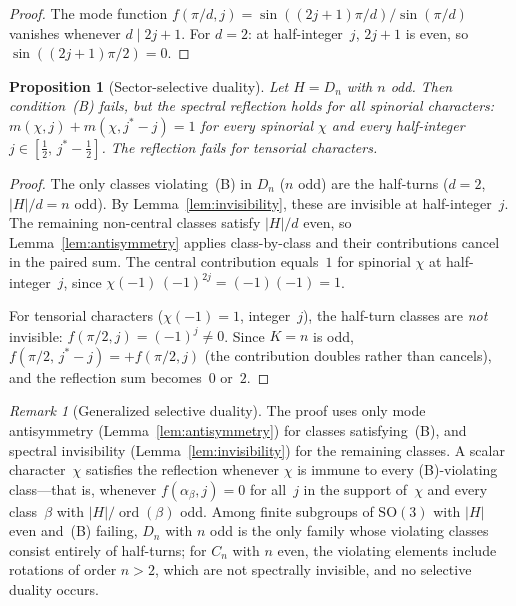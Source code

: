 \documentclass[12pt]{article}
\newtheorem{proposition}[theorem]{Proposition}
\theoremstyle{definition}
\theoremstyle{remark}
\newtheorem{remark}[theorem]{Remark}
\newcommand{\SO}{\mathrm{SO}}
\DeclareMathOperator{\ord}{ord}
\begin{document}
\begin{proof}
  The mode function $f(\pi/d, j) = \sin((2j{+}1)\pi/d)/\sin(\pi/d)$
  vanishes whenever $d \mid 2j{+}1$.
  For $d = 2$: at half-integer~$j$, $2j{+}1$ is even,
  so $\sin((2j{+}1)\pi/2) = 0$.
\end{proof}

\begin{proposition}[Sector-selective duality]
  \label{prop:sector-selective}
  Let $H = D_n$ with $n$ odd.
  Then condition~\textup{(B)} fails, but the spectral
  reflection holds for all spinorial characters:
  $m(\chi,j) + m(\chi,j^*{-}j) = 1$ for every spinorial
  $\chi$ and every half-integer $j \in [\tfrac{1}{2},\,
  j^*{-}\tfrac{1}{2}]$.
  The reflection fails for tensorial characters.
\end{proposition}

\begin{proof}
  The only classes violating~(B) in $D_n$ ($n$ odd) are
  the half-turns ($d = 2$, $|H|/d = n$ odd).
  By Lemma~\ref{lem:invisibility}, these are invisible at
  half-integer~$j$.
  The remaining non-central classes satisfy $|H|/d$ even, so
  Lemma~\ref{lem:antisymmetry} applies class-by-class
  and their contributions cancel in the paired sum.
  The central contribution equals~$1$ for spinorial
  $\chi$ at half-integer~$j$, since
  $\chi(-1)\,(-1)^{2j} = (-1)(-1) = 1$.

  For tensorial characters ($\chi(-1) = 1$, integer~$j$),
  the half-turn classes are \emph{not} invisible:
  $f(\pi/2, j) = (-1)^j \neq 0$.
  Since $K = n$ is odd,
  $f(\pi/2,\, j^*{-}j) = +f(\pi/2, j)$
  (the contribution doubles rather than cancels),
  and the reflection sum becomes~$0$ or~$2$.
\end{proof}

\begin{remark}[Generalized selective duality]
  \label{rem:generalized-selective}
The proof uses only mode antisymmetry
(Lemma~\ref{lem:antisymmetry}) for classes satisfying~(B),
and spectral invisibility (Lemma~\ref{lem:invisibility})
for the remaining classes.
A scalar character~$\chi$ satisfies the reflection
whenever $\chi$ is immune to every (B)-violating class---that is,
whenever $f(\alpha_\beta, j) = 0$ for all~$j$ in the
support of~$\chi$ and every class~$\beta$ with
$|H|/\ord(\beta)$ odd.
Among finite subgroups of $\SO(3)$ with $|H|$ even
and~(B) failing, $D_n$ with $n$ odd is the only family
whose violating classes consist entirely of half-turns;
for $C_n$ with $n$ even, the violating elements include
rotations of order $n > 2$, which are not spectrally
invisible, and no selective duality occurs.
\end{remark}
\end{document}
